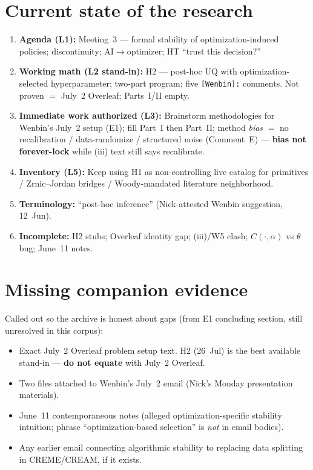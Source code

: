 \documentclass[11pt]{article}
\begin{document}
\section{Current state of the research}
\begin{enumerate}[leftmargin=*]
  \item \textbf{Agenda (L1):} Meeting~3 --- formal stability of optimization-induced policies;
        discontinuity; AI$\to$optimizer; HT ``trust this decision?''
  \item \textbf{Working math (L2 stand-in):} H2 --- post-hoc UQ with optimization-selected
        hyperparameter; two-part program; five \texttt{[Wenbin]:} comments. Not proven $=$ July~2
        Overleaf; Parts~I/II empty.
  \item \textbf{Immediate work authorized (L3):} Brainstorm methodologies for Wenbin's July~2
        setup (E1); fill Part~I then Part~II; method \emph{bias} $=$ no recalibration /
        data-randomize / structured noise (Comment~E) --- \textbf{bias not forever-lock} while
        (iii) text still says recalibrate.
  \item \textbf{Inventory (L5):} Keep using H1 as non-controlling live catalog for primitives /
        Zrnic--Jordan bridges / Woody-mandated literature neighborhood.
  \item \textbf{Terminology:} ``post-hoc inference'' (Nick-attested Wenbin suggestion, 12~Jun).
  \item \textbf{Incomplete:} H2 stubs; Overleaf identity gap; (iii)/W5 clash; $C(\cdot,\alpha)$ vs
        $\theta$ bug; June~11 notes.
\end{enumerate}

\section{Missing companion evidence}
Called out so the archive is honest about gaps (from E1 concluding section, still unresolved
in this corpus):
\begin{itemize}[leftmargin=*]
  \item Exact July~2 Overleaf problem setup text.
        H2 (26~Jul) is the best available stand-in --- \textbf{do not equate} with July~2 Overleaf.
  \item Two files attached to Wenbin's July~2 email (Nick's Monday presentation materials).
  \item June~11 contemporaneous notes (alleged optimization-specific stability intuition;
        phrase ``optimization-based selection'' is \emph{not} in email bodies).
  \item Any earlier email connecting algorithmic stability to replacing data splitting in
        CREME/CREAM, if it exists.
\end{itemize}
\end{document}
